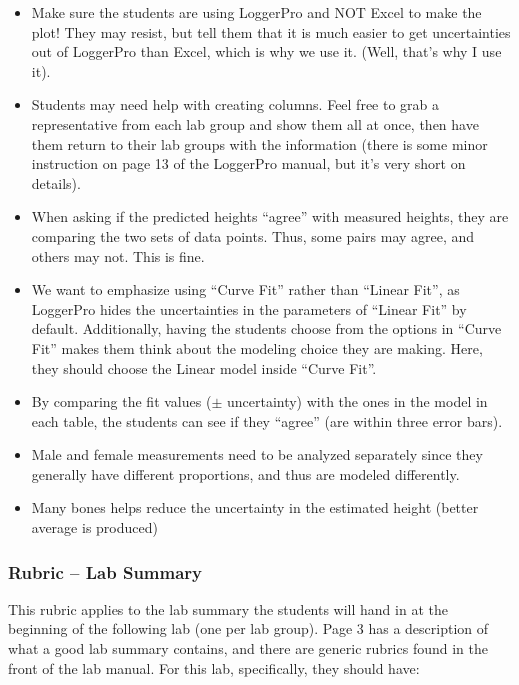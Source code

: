 \documentclass[fleqn,letterpaper]{article}
\begin{document}
\begin{itemize}
\item{Make sure the students are using LoggerPro and NOT Excel to make the plot!  They may resist, but tell them that it is much easier to get uncertainties out of LoggerPro than Excel, which is why we use it. (Well, that's why I use it).}
\item{Students may need help with creating columns.  Feel free to grab a representative from each lab group and show them all at once, then have them return to their lab groups with the information (there is some minor instruction on page 13 of the LoggerPro manual, but it's very short on details).}
\item{When asking if the predicted heights ``agree'' with measured heights, they are comparing the two sets of data points.  Thus, some pairs may agree, and others may not.  This is fine.}
\item{We want to emphasize using ``Curve Fit'' rather than ``Linear Fit'', as LoggerPro hides the uncertainties in the parameters of ``Linear Fit'' by default.  Additionally, having the students choose from the options in ``Curve Fit'' makes them think about the modeling choice they are making.  Here, they should choose the Linear model inside ``Curve Fit''.}
\item{By comparing the fit values ($\pm$ uncertainty) with the ones in the model in each table, the students can see if they ``agree'' (are within three error bars).}
\item{Male and female measurements need to be analyzed separately since they generally have different proportions, and thus are modeled differently.}
\item{Many bones helps reduce the uncertainty in the estimated height (better average is produced)}
\end{itemize}

\subsubsection*{Rubric -- Lab Summary}

This rubric applies to the lab summary the students will hand in at the beginning of the following lab (one per lab group).  Page 3 has a description of what a good lab summary contains, and there are generic rubrics found in the front of the lab manual.  For this lab, specifically, they should have:
\end{document}

